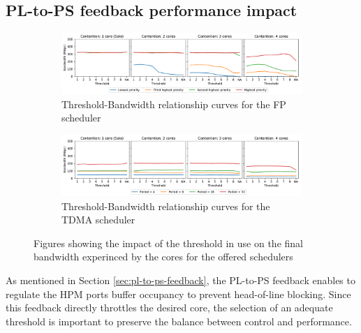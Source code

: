 \subsection{PL-to-PS feedback performance impact}
\label{sec:feedback-pressure}
\begin{figure}[]
  \centering
  \begin{subfigure}{0.9\textwidth}
    \centering
    \includegraphics[scale=0.4]{images/fp.pdf}
    \caption{Threshold-Bandwidth relationship curves for the FP scheduler}
    \label{fig:threshold_fp}
  \end{subfigure}
  \hfill
  \begin{subfigure}{0.9\textwidth}
    \centering
    \includegraphics[scale=0.4]{images/tdma.pdf}
    \caption{Threshold-Bandwidth relationship curves for the TDMA scheduler}
    \label{fig:threshold_tdma}
  \end{subfigure}
  \caption{Figures showing the impact of the threshold in use on the final bandwidth experinced by the cores for the offered schedulers}
  \label{fig:schim_threshold}
\end{figure}
As mentioned in Section \ref{sec:pl-to-ps-feedback}, the PL-to-PS feedback enables
\schim to regulate the HPM ports buffer occupancy to prevent head-of-line blocking.
Since this feedback directly throttles the desired core, the selection of an adequate
threshold is important to preserve the balance between control and performance.
